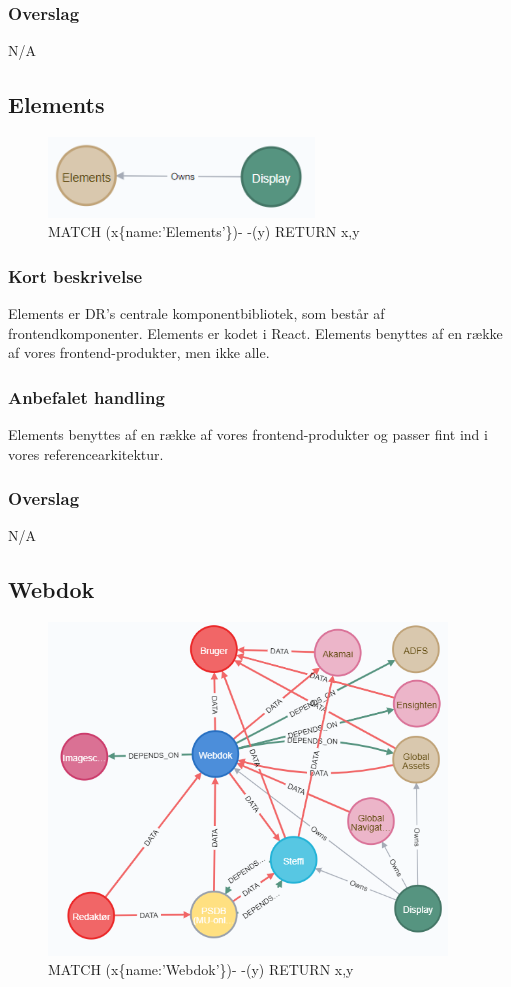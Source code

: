 \documentclass{article}
\begin{document}
\subsubsection{Overslag}
N/A

\subsection{Elements}
\begin{figure}[h]
\includegraphics[width=200pt]{Elements.PNG}
\caption{MATCH (x\{name:'Elements'\})- -(y) RETURN x,y}
\end{figure}
\subsubsection{Kort beskrivelse}
Elements er DR's centrale komponentbibliotek, som består af frontendkomponenter. Elements er kodet i React. Elements benyttes af en række af vores frontend-produkter, men ikke alle.
\subsubsection{Anbefalet handling}
Elements benyttes af en række af vores frontend-produkter og passer fint ind i vores referencearkitektur.
\subsubsection{Overslag}
N/A

\subsection{Webdok}
\begin{figure}[h]
\includegraphics[width=300pt]{Webdok.PNG}
\caption{MATCH (x\{name:'Webdok'\})- -(y) RETURN x,y}
\end{figure}
\end{document}
